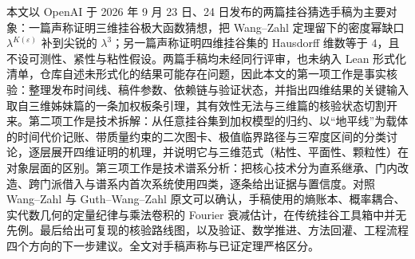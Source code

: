 本文以 OpenAI 于 2026 年 9 月 23 日、24 日发布的两篇挂谷猜选手稿为主要对象：一篇声称证明三维挂谷极大函数猜想，把 Wang--Zahl 定理留下的密度幂缺口 $\lambda^{K(\varepsilon)}$ 补到尖锐的 $\lambda^{3}$；另一篇声称证明四维挂谷集的 Hausdorff 维数等于 $4$，且不设可测性、紧性与粘性假设。两篇手稿均未经同行评审，也未纳入 Lean 形式化清单，仓库自述未形式化的结果可能存在问题，因此本文的第一项工作是事实核验：整理发布时间线、稿件参数、依赖链与验证状态，并指出四维结果的关键输入取自三维姊妹篇的一条加权板条引理，其有效性无法与三维篇的核验状态切割开来。第二项工作是技术拆解：从任意挂谷集到加权模型的归约、以“地平线”为载体的时间代价记账、带质量约束的二次图卡、极值临界路径与三窄度区间的分类讨论，逐层展开四维证明的机理，并说明它与三维范式（粘性、平面性、颗粒性）在对象层面的区别。第三项工作是技术谱系分析：把核心技术分为直系继承、门内改造、跨门派借入与谱系内首次系统使用四类，逐条给出证据与置信度。对照 Wang--Zahl 与 Guth--Wang--Zahl 原文可以确认，手稿使用的熵账本、概率耦合、实代数几何的定量纪律与乘法卷积的 Fourier 衰减估计，在传统挂谷工具箱中并无先例。最后给出可复现的核验路线图，以及验证、数学推进、方法回灌、工程流程四个方向的下一步建议。全文对手稿声称与已证定理严格区分。